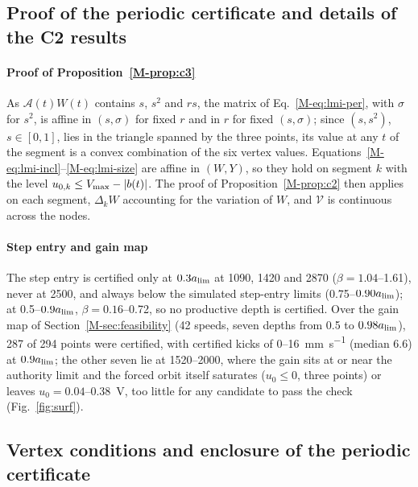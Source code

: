 \subsection{Proof of the periodic certificate and details of the C2 results}\label{supp:proof-c3}

\paragraph{Proof of Proposition~\ref{M-prop:c3}} As $\mathcal A(t)W(t)$ contains $s$, $s^2$ and $rs$, the matrix of Eq.~\eqref{M-eq:lmi-per}, with $\sigma$ for $s^2$, is affine in $(s,\sigma)$ for fixed $r$ and in $r$ for fixed $(s,\sigma)$; since $(s,s^2)$, $s\in[0,1]$, lies in the triangle spanned by the three points, its value at any $t$ of the segment is a convex combination of the six vertex values. Equations~\eqref{M-eq:lmi-incl}--\eqref{M-eq:lmi-size} are affine in $(W,Y)$, so they hold on segment $k$ with the level $u_{0,k}\le V_{\max}-\lvert b(t)\rvert$. The proof of Proposition~\ref{M-prop:c2} then applies on each segment, $\Delta_kW$ accounting for the variation of $W$, and $\mathcal V$ is continuous across the nodes.


\paragraph{Step entry and gain map} The step entry is certified only at $0.3a_{\lim}$ at 1090, 1420 and \SI{2870}{\rpm} ($\beta=1.04$--1.61), never at \SI{2500}{\rpm}, and always below the simulated step-entry limits (0.75--$0.90a_{\lim}$); at 0.5--$0.9a_{\lim}$, $\beta=0.16$--0.72, so no productive depth is certified. Over the gain map of Section~\ref{M-sec:feasibility} (42 speeds, seven depths from 0.5 to $0.98a_{\lim}$), 287 of 294 points were certified, with certified kicks of 0--\SI{16}{\milli\metre\per\second} (median 6.6) at $0.9a_{\lim}$; the other seven lie at 1520--\SI{2000}{\rpm}, where the gain sits at or near the authority limit and the forced orbit itself saturates ($u_0\le0$, three points) or leaves $u_0=0.04$--\SI{0.38}{\volt}, too little for any candidate to pass the check (Fig.~\ref{fig:surf}).

\subsection{Vertex conditions and enclosure of the periodic certificate}\label{supp:cert-vertex}

